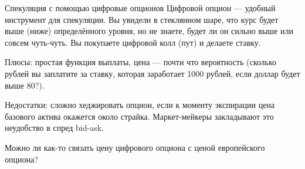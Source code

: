 \documentclass{beamer}
\newcommand{\usdrubstrike}{80}
\begin{document}
\begin{frame}{Спекуляция с помощью цифровые опционов}
\justify
Цифровой опцион --- удобный инструмент для спекуляции. Вы увидели в стеклянном шаре,
что курс будет выше (ниже) определённого уровня, но не знаете, будет ли он сильно выше
или совсем чуть-чуть. Вы покупаете цифровой колл (пут) и делаете ставку.

\justify
Плюсы: простая функция выплаты, цена --- почти что вероятность (сколько рублей вы 
заплатите за ставку, которая заработает 1000 рублей, если доллар будет выше \usdrubstrike?). 

\justify
Недостатки: сложно хеджировать опцион, если к моменту экспирации цена базового актива окажется около страйка. Маркет-мейкеры закладывают это неудобство в спред bid-ask.

\justify
Можно ли как-то связать цену цифрового опциона с ценой европейского опциона?
\end{frame}

\newcommand{\leftstrikeA}{79.5}
\newcommand{\leftstrikeB}{79.75}
\newcommand{\leftstrikeC}{79.95}
\newcommand{\rightstrikeA}{80.5}
\newcommand{\rightstrikeB}{80.25}
\newcommand{\rightstrikeC}{80.05}
\end{document}
